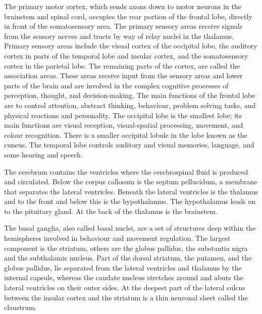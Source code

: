 The primary motor cortex, which sends axons down to motor neurons in the brainstem and spinal cord, occupies the rear portion of the frontal lobe, directly in front of the somatosensory area. The primary sensory areas receive signals from the sensory nerves and tracts by way of relay nuclei in the thalamus. Primary sensory areas include the visual cortex of the occipital lobe, the auditory cortex in parts of the temporal lobe and insular cortex, and the somatosensory cortex in the parietal lobe. The remaining parts of the cortex, are called the association areas. These areas receive input from the sensory areas and lower parts of the brain and are involved in the complex cognitive processes of perception, thought, and decision-making. The main functions of the frontal lobe are to control attention, abstract thinking, behaviour, problem solving tasks, and physical reactions and personality. The occipital lobe is the smallest lobe; its main functions are visual reception, visual-spatial processing, movement, and colour recognition. There is a smaller occipital lobule in the lobe known as the cuneus. The temporal lobe controls auditory and visual memories, language, and some hearing and speech.

The cerebrum contains the ventricles where the cerebrospinal fluid is produced and circulated. Below the corpus callosum is the septum pellucidum, a membrane that separates the lateral ventricles. Beneath the lateral ventricles is the thalamus and to the front and below this is the hypothalamus. The hypothalamus leads on to the pituitary gland. At the back of the thalamus is the brainstem.

The basal ganglia, also called basal nuclei, are a set of structures deep within the hemispheres involved in behaviour and movement regulation. The largest component is the striatum, others are the globus pallidus, the substantia nigra and the subthalamic nucleus. Part of the dorsal striatum, the putamen, and the globus pallidus, lie separated from the lateral ventricles and thalamus by the internal capsule, whereas the caudate nucleus stretches around and abuts the lateral ventricles on their outer sides. At the deepest part of the lateral sulcus between the insular cortex and the striatum is a thin neuronal sheet called the claustrum.

